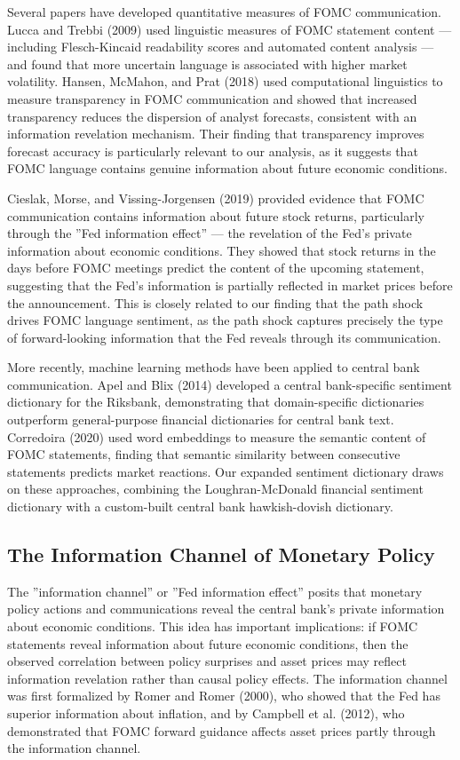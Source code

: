\documentclass[12pt]{article}
\begin{document}
Several papers have developed quantitative measures of FOMC communication. Lucca and Trebbi (2009) used linguistic measures of FOMC statement content --- including Flesch-Kincaid readability scores and automated content analysis --- and found that more uncertain language is associated with higher market volatility. Hansen, McMahon, and Prat (2018) used computational linguistics to measure transparency in FOMC communication and showed that increased transparency reduces the dispersion of analyst forecasts, consistent with an information revelation mechanism. Their finding that transparency improves forecast accuracy is particularly relevant to our analysis, as it suggests that FOMC language contains genuine information about future economic conditions.

Cieslak, Morse, and Vissing-Jorgensen (2019) provided evidence that FOMC communication contains information about future stock returns, particularly through the ''Fed information effect'' --- the revelation of the Fed's private information about economic conditions. They showed that stock returns in the days before FOMC meetings predict the content of the upcoming statement, suggesting that the Fed's information is partially reflected in market prices before the announcement. This is closely related to our finding that the path shock drives FOMC language sentiment, as the path shock captures precisely the type of forward-looking information that the Fed reveals through its communication.

More recently, machine learning methods have been applied to central bank communication. Apel and Blix (2014) developed a central bank-specific sentiment dictionary for the Riksbank, demonstrating that domain-specific dictionaries outperform general-purpose financial dictionaries for central bank text. Corredoira (2020) used word embeddings to measure the semantic content of FOMC statements, finding that semantic similarity between consecutive statements predicts market reactions. Our expanded sentiment dictionary draws on these approaches, combining the Loughran-McDonald financial sentiment dictionary with a custom-built central bank hawkish-dovish dictionary.

\subsection{The Information Channel of Monetary Policy}

The ''information channel'' or ''Fed information effect'' posits that monetary policy actions and communications reveal the central bank's private information about economic conditions. This idea has important implications: if FOMC statements reveal information about future economic conditions, then the observed correlation between policy surprises and asset prices may reflect information revelation rather than causal policy effects. The information channel was first formalized by Romer and Romer (2000), who showed that the Fed has superior information about inflation, and by Campbell et al. (2012), who demonstrated that FOMC forward guidance affects asset prices partly through the information channel.
\end{document}
